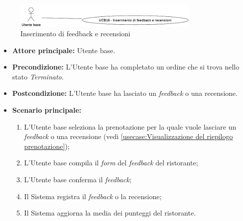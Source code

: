 \newpage
{}
\label{usecase:Inserimento di feedback e recensioni}

\begin{figure}[h]
	\centering
	\includegraphics[width=0.8\textwidth]{./uml/UCB16.png} 
	\caption{Inserimento di feedback e recensioni}
	\label{fig:UCB16}
  \end{figure}

\begin{itemize}
	\item \textbf{Attore principale:} Utente base.

	\item \textbf{Precondizione:} L'Utente base ha completato un ordine che si
	      trova nello stato \textit{Terminato}.

	\item \textbf{Postcondizione:} L'Utente base ha lasciato un \textit{feedback} o una recensione.

	\item \textbf{Scenario principale:}
	      \begin{enumerate}
		      \item L'Utente base seleziona la prenotazione per la quale vuole
		            lasciare un \textit{feedback} o una recensione (vedi
		            \autoref{usecase:Visualizzazione del riepilogo prenotazione});

		      \item L'Utente base compila il \textit{form} del \textit{feedback} del ristorante;

		      \item L'Utente base conferma il \textit{feedback};

		      \item Il Sistema registra il \textit{feedback} o la recensione;

		      \item Il Sistema aggiorna la media dei punteggi del ristorante.

	      \end{enumerate}
\end{itemize}
